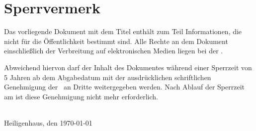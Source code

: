 \thispagestyle{empty}
\section*{Sperrvermerk}

Das vorliegende Dokument mit dem Titel \glqq{}\thetitle\grqq{} enthält zum Teil Informationen, die nicht für die Öffentlichkeit bestimmt sind. Alle Rechte an dem Dokument einschließlich der Verbreitung auf elektronischen Medien liegen bei der \companyname.

Abweichend hiervon darf der Inhalt des Dokumentes während einer Sperrzeit von 5 Jahren ab dem Abgabedatum mit der ausdrücklichen schriftlichen Genehmigung der \companyname \ an Dritte weitergegeben werden. Nach Ablauf der Sperrzeit am \printdate{\publicdate} ist diese Genehmigung nicht mehr erforderlich.

\bigskip

\vspace*{3cm}

\underline{\hspace*{7cm}}\\
\smallskip
Heiligenhaus, den \today
